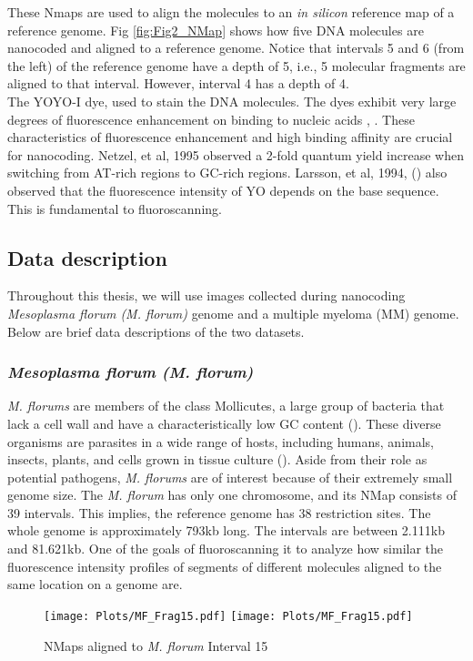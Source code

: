 These Nmaps are used to align the molecules to an {\emph{in silicon}} reference map of a reference genome. Fig \ref{fig:Fig2_NMap} shows how five DNA molecules are nanocoded and aligned to a reference genome. Notice that intervals 5 and 6 (from the left) of the reference genome have a depth of 5, i.e., 5 molecular fragments are aligned to that interval. However, interval 4 has a depth of 4. \\

The YOYO-I dye, used to stain the DNA molecules. The dyes exhibit very large degrees of fluorescence enhancement on binding to nucleic acids \cite{Rye_etal_1992_NAR}, \cite{Lee_etal_1986_Cytometry}. These characteristics of fluorescence enhancement and high binding affinity are crucial for nanocoding. Netzel, et al, 1995 \cite{Netzel_etal_1995_JPC} observed a 2-fold quantum yield increase when switching from AT-rich regions to GC-rich regions. Larsson, et al, 1994, (\cite{Larsson_etal_1994_JACS}) also observed that the fluorescence intensity of YO depends on the base sequence. This is fundamental to fluoroscanning.  

\subsection{Data description} \label{Ch2_data}
Throughout this thesis, we will use images collected during nanocoding {\emph{Mesoplasma florum (M. florum)}} genome and a multiple myeloma (MM) genome. Below are brief data descriptions of the two datasets.
\subsubsection*{\emph{Mesoplasma florum (M. florum)}}
{\emph{M. florums}} are members of the class Mollicutes, a large group of bacteria that lack a cell wall and have a characteristically low GC content (\cite{Razin_etal_1998_MMBR}). These diverse organisms are parasites in a wide range of hosts, including humans, animals, insects, plants, and cells grown in tissue culture (\cite{Razin_etal_1998_MMBR}). Aside from their role as potential pathogens, {\emph{M. florums}} are of interest because of their extremely small genome size. The {\emph{M. florum}} has only one chromosome, and its NMap consists of 39 intervals. This implies, the reference genome has 38 restriction sites. The whole genome is approximately 793kb long. The intervals are between 2.111kb and 81.621kb. One of the goals of fluoroscanning it to analyze how similar the fluorescence intensity profiles of segments of different molecules aligned to the same location on a genome are. 
\begin{figure}[H]
\begin{center}
\texttt{[image: Plots/MF\_Frag15.pdf]}
\texttt{[image: Plots/MF\_Frag15.pdf]}
\end{center}
\caption{NMaps aligned to {\emph{M. florum}} Interval 15}
\label{fig:Fig2_MF_Frag15}
\end{figure}

